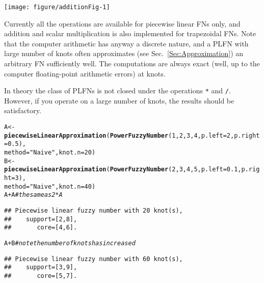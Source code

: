 \documentclass[11pt]{article}\usepackage[]{graphicx}\usepackage[]{color}
\makeatletter
\newcommand{\hlnum}[1]{\textcolor[rgb]{0.686,0.059,0.569}{#1}}%
\newcommand{\hlstr}[1]{\textcolor[rgb]{0.192,0.494,0.8}{#1}}%
\newcommand{\hlcom}[1]{\textcolor[rgb]{0.678,0.584,0.686}{\textit{#1}}}%
\newcommand{\hlopt}[1]{\textcolor[rgb]{0,0,0}{#1}}%
\newcommand{\hlstd}[1]{\textcolor[rgb]{0.345,0.345,0.345}{#1}}%
\newcommand{\hlkwb}[1]{\textcolor[rgb]{0.69,0.353,0.396}{#1}}%
\newcommand{\hlkwc}[1]{\textcolor[rgb]{0.333,0.667,0.333}{#1}}%
\newcommand{\hlkwd}[1]{\textcolor[rgb]{0.737,0.353,0.396}{\textbf{#1}}}%
\newenvironment{kframe}{%
 \def\at@end@of@kframe{}%
 \ifinner\ifhmode%
  \def\at@end@of@kframe{\end{minipage}}%
  \begin{minipage}{\columnwidth}%
 \fi\fi%
 \def\FrameCommand##1{\hskip\@totalleftmargin \hskip-\fboxsep
 \colorbox{shadecolor}{##1}\hskip-\fboxsep
     \hskip-\linewidth \hskip-\@totalleftmargin \hskip\columnwidth}%
 \MakeFramed {\advance\hsize-\width
   \@totalleftmargin\z@ \linewidth\hsize
   \@setminipage}}%
 {\par\unskip\endMakeFramed%
 \at@end@of@kframe}
\newenvironment{knitrout}{}{} %
\makeatother
\begin{document}
\begin{center}
\begin{knitrout}\small
{}\color{fgcolor}

{\centering \texttt{[image: figure/additionFig-1]} 

}



\end{knitrout}
\end{center}


Currently all the operations are available
for piecewise linear FNs only,
and addition and scalar multiplication
is also implemented for trapezoidal FNs.
Note that the computer arithmetic has anyway
a discrete nature, and a PLFN with large number
of knots often approximates (see Sec.~\ref{Sec:Approximation})
an arbitrary FN sufficiently well.
The computations are always exact (well, up to the computer
floating-point arithmetic errors) at knots.

In theory the class of PLFNs is not closed
under the operations \texttt{*} and \texttt{/}.
However, if you operate on a large number of knots,
the results should be satisfactory.



\begin{knitrout}\small
{}\color{fgcolor}\begin{kframe}
\begin{alltt}
\hlstd{A} \hlkwb{<-} \hlkwd{piecewiseLinearApproximation}\hlstd{(}\hlkwd{PowerFuzzyNumber}\hlstd{(}\hlnum{1}\hlstd{,}\hlnum{2}\hlstd{,}\hlnum{3}\hlstd{,}\hlnum{4}\hlstd{,}\hlkwc{p.left}\hlstd{=}\hlnum{2}\hlstd{,}\hlkwc{p.right}\hlstd{=}\hlnum{0.5}\hlstd{),}
   \hlkwc{method}\hlstd{=}\hlstr{"Naive"}\hlstd{,} \hlkwc{knot.n}\hlstd{=}\hlnum{20}\hlstd{)}
\hlstd{B} \hlkwb{<-} \hlkwd{piecewiseLinearApproximation}\hlstd{(}\hlkwd{PowerFuzzyNumber}\hlstd{(}\hlnum{2}\hlstd{,}\hlnum{3}\hlstd{,}\hlnum{4}\hlstd{,}\hlnum{5}\hlstd{,}\hlkwc{p.left}\hlstd{=}\hlnum{0.1}\hlstd{,}\hlkwc{p.right}\hlstd{=}\hlnum{3}\hlstd{),}
   \hlkwc{method}\hlstd{=}\hlstr{"Naive"}\hlstd{,} \hlkwc{knot.n}\hlstd{=}\hlnum{40}\hlstd{)}
\hlstd{A}\hlopt{+}\hlstd{A} \hlcom{# the same as 2*A}
\end{alltt}
\begin{verbatim}
## Piecewise linear fuzzy number with 20 knot(s),
##    support=[2,8],
##       core=[4,6].
\end{verbatim}
\begin{alltt}
\hlstd{A}\hlopt{+}\hlstd{B} \hlcom{# note the number of knots has increased}
\end{alltt}
\begin{verbatim}
## Piecewise linear fuzzy number with 60 knot(s),
##    support=[3,9],
##       core=[5,7].
\end{verbatim}
\end{kframe}
\end{knitrout}
\end{document}
